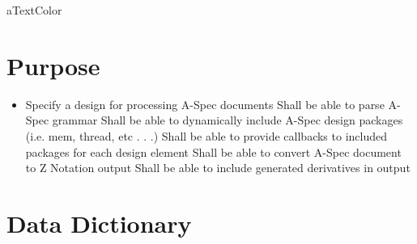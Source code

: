 \documentclass[letterpaper,10pt,draft]{article}
\begin{document}
\raggedright
\raggedbottom

\parindent=0in

\csname aTextColor\endcsname

\section{Purpose}
   \label{sect:Purpose}

\begin{itemize}
   \item Specify a design for processing A-Spec documents
      \subitem Shall be able to parse A-Spec grammar
      \subitem Shall be able to dynamically include A-Spec design packages (i.e. mem, thread, etc . . .)
      \subitem Shall be able to provide callbacks to included packages for each design element
      \subitem Shall be able to convert A-Spec document to Z Notation output
      \subitem Shall be able to include generated derivatives in output
\end{itemize}

\section{Data Dictionary}
   \label{sect:DataDict}

\begin{zed}
    \\
    \\
    \\
    \\
    \\
\end{zed}
\end{document}
